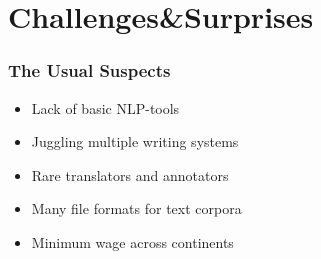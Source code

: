 \documentclass[aspectratio=169]{beamer}
\begin{document}
\section{Challenges\&Surprises}

\begin{frame}[fragile]
	\frametitle{The Usual Suspects}
    \begin{itemize}
        \item Lack of basic NLP-tools
        \item Juggling multiple writing systems
        \item Rare translators and annotators
        \item Many file formats for text corpora
        \item Minimum wage across continents
    \end{itemize}
\end{frame}
\end{document}
